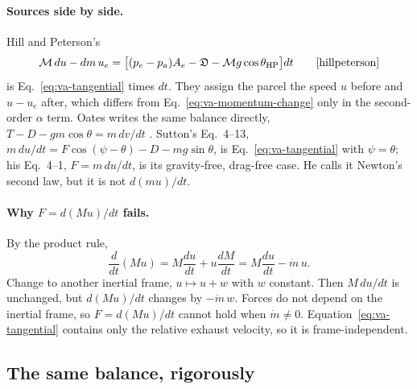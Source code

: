 \paragraph{Sources side by side.} Hill and Peterson's
\[
 \mathcal M\,du-dm\,u_e
 =\bigl[(p_e-p_a)A_e-\mathfrak D-\mathcal Mg\cos\theta_{\rm HP}\bigr]dt
 \qquad\text{\cite[Eq.~(10.8)]{hillpeterson}}
\]
is Eq.~\ref{eq:va-tangential} times $dt$. They assign the parcel the speed
$u$ before and $u-u_e$ after, which differs from
Eq.~\ref{eq:va-momentum-change} only in the second-order $\alpha$ term.
Oates writes the same balance directly,
$T-D-gm\cos\theta=m\,dv/dt$ \cite[Eq.~(3.10)]{oates}. Sutton's Eq.~4--13,
$m\,du/dt=F\cos(\psi-\theta)-D-mg\sin\theta$, is Eq.~\ref{eq:va-tangential}
with $\psi=\theta$; his Eq.~4--1, $F=m\,du/dt$, is its gravity-free,
drag-free case. He calls it Newton's second law, but it is not $d(mu)/dt$.

\paragraph{Why $F=d(Mu)/dt$ fails.} By the product rule,
\[
 \frac{d}{dt}(Mu)=M\frac{du}{dt}+u\frac{dM}{dt}
 =M\frac{du}{dt}-\dot m\,u .
\]
Change to another inertial frame, $u\mapsto u+w$ with $w$ constant. Then
$M\,du/dt$ is unchanged, but $d(Mu)/dt$ changes by $-\dot m\,w$. Forces do
not depend on the inertial frame, so $F=d(Mu)/dt$ cannot hold when
$\dot m\neq0$. Equation~\ref{eq:va-tangential} contains only the relative
exhaust velocity, so it is frame-independent.

\subsection{The same balance, rigorously}
\label{sec:va-rigour}
